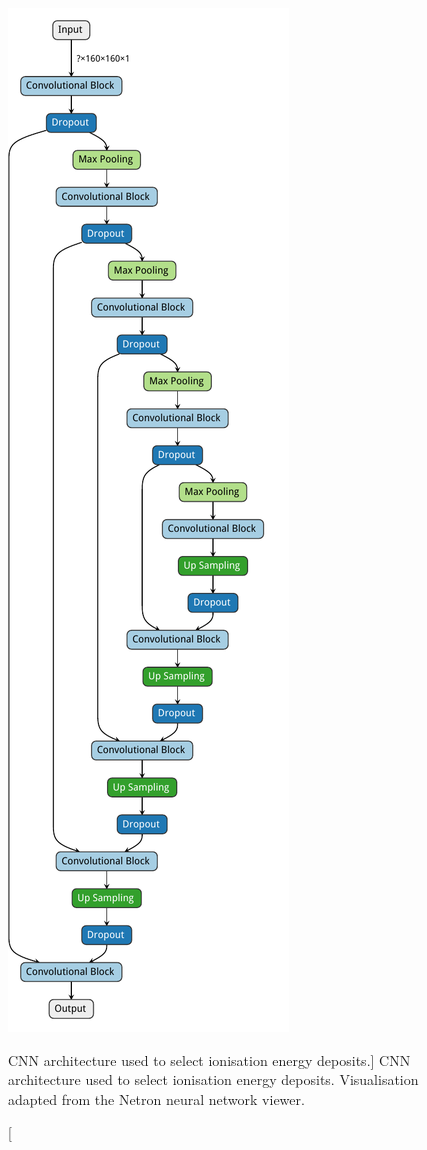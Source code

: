 \begin{figure}
	\hspace{0.40\textwidth}
	\includegraphics[height=0.97\textheight]{figures/unet_arch.pdf}
	\caption
	[CNN architecture used to select ionisation energy deposits.]
	{CNN architecture used to select ionisation energy deposits. Visualisation 
	adapted from the Netron neural network viewer\cite{netron}.}
	\label{fig:unet_arch}
\end{figure}

